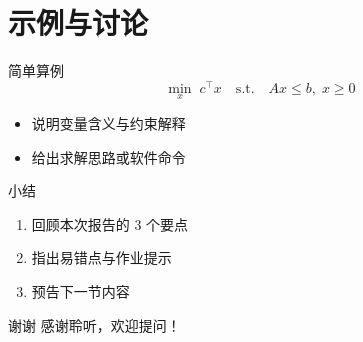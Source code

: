 \documentclass[UTF8,aspectratio=169,10pt]{ctexbeamer}
\begin{document}
\section{示例与讨论}

\begin{frame}{简单算例}
  \begin{equation}
    \min_{x} \; c^{\top}x
    \quad \text{s.t.} \quad
    Ax \le b,\; x \ge 0
  \end{equation}
  \begin{itemize}
    \item 说明变量含义与约束解释
    \item 给出求解思路或软件命令
  \end{itemize}
\end{frame}

\begin{frame}{小结}
  \begin{enumerate}
    \item 回顾本次报告的 3 个要点
    \item 指出易错点与作业提示
    \item 预告下一节内容
  \end{enumerate}
\end{frame}

\begin{frame}{谢谢}
  \centering
  {\Large 感谢聆听，欢迎提问！}
\end{frame}
\end{document}
